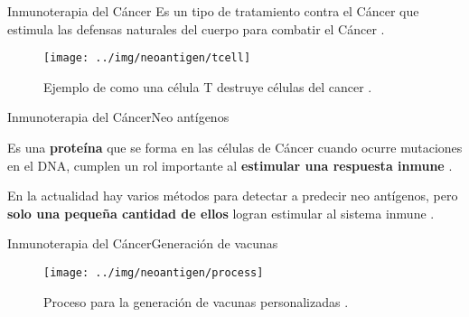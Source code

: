 \documentclass[10pt]{beamer}
\newcommand{\1}{
	\setbeamertemplate{background}{
		\texttt{[image: ../img/1]}
		\tikz[overlay] \fill[fill opacity=0.75,fill=white] (0,0) rectangle (-\paperwidth,\paperheight);
	}
}
\begin{document}
\begin{frame}{Inmunoterapia del Cáncer}{}		
	Es un tipo de tratamiento contra el Cáncer que estimula las defensas naturales del cuerpo para combatir el Cáncer \cite{inmunoterapy2022}.
		
	\begin{figure}
		\texttt{[image: ../img/neoantigen/tcell]}
		\caption{Ejemplo de como una célula T destruye células del cancer \cite{nortshore2022}.}
	\end{figure}		
\end{frame}

\begin{frame}{Inmunoterapia del Cáncer}{Neo antígenos}		
	\begin{block}{}
		Es una \textbf{proteína} que se forma en las células de Cáncer cuando ocurre mutaciones en el DNA, cumplen un rol importante al \textbf{estimular una respuesta inmune} \cite{NCIdictionary2022, borden2022cancer}.
	\end{block} 
	\begin{block}{}
		En la actualidad hay varios métodos para detectar a predecir neo antígenos, pero \textbf{solo una pequeña cantidad de ellos} logran estimular al sistema inmune \cite{chen2021challenges, hao2021improvement}.
	\end{block}
\end{frame}

\begin{frame}{Inmunoterapia del Cáncer}{Generación de vacunas}	
	\begin{figure}
		\texttt{[image: ../img/neoantigen/process]}
		\caption{Proceso para la generación de vacunas personalizadas \cite{peng2019neoantigen}.}
	\end{figure}		
\end{frame}
\end{document}
